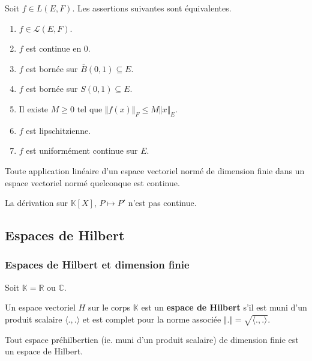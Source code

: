   \begin{theorem}
    Soit $f \in L(E,F)$. Les assertions suivantes sont équivalentes.
    \begin{enumerate}[label=(\roman*)]
      \item $f \in \mathcal{L}(E,F)$.
      \item $f$ est continue en $0$.
      \item $f$ est bornée sur $\overline{B}(0,1) \subseteq E$.
      \item $f$ est bornée sur $S(0,1) \subseteq E$.
      \item Il existe $M \geq 0$ tel que $\Vert f(x) \Vert_F \leq M \Vert x \Vert_E$.
      \item $f$ est lipschitzienne.
      \item $f$ est uniformément continue sur $E$.
    \end{enumerate}
  \end{theorem}

  \begin{proposition}
    Toute application linéaire d'un espace vectoriel normé de dimension finie dans un espace vectoriel normé quelconque est continue.
  \end{proposition}

  \begin{cexample}
    La dérivation sur $\mathbb{K}[X]$, $P \mapsto P'$ n'est pas continue.
  \end{cexample}

  \subsection{Espaces de Hilbert}

  \subsubsection{Espaces de Hilbert et dimension finie}


  Soit $\mathbb{K} = \mathbb{R}$ ou $\mathbb{C}$.

  \begin{definition}
    Un espace vectoriel $H$ sur le corps $\mathbb{K}$ est un \textbf{espace de Hilbert} s'il est muni d'un produit scalaire $\langle . , . \rangle$ et est complet pour la norme associée $\Vert . \Vert = \sqrt{\langle . , . \rangle}$.
  \end{definition}

  \begin{example}
    Tout espace préhilbertien (ie. muni d'un produit scalaire) de dimension finie est un espace de Hilbert.
  \end{example}

